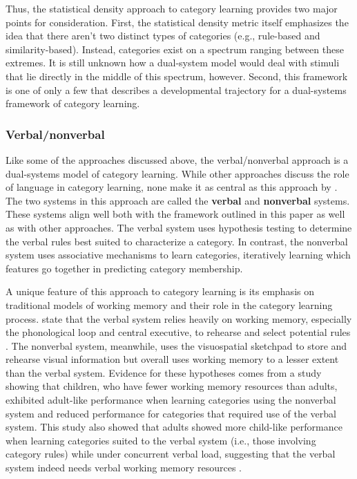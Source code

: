 \documentclass[../dissertation.tex]{subfiles}
\begin{document}
	Thus, the statistical density approach to category learning provides two major points for consideration. First, the statistical density metric itself emphasizes the idea that there aren't two distinct types of categories (e.g., rule-based and similarity-based). Instead, categories exist on a spectrum ranging between these extremes. It is still unknown how a dual-system model would deal with stimuli that lie directly in the middle of this spectrum, however. Second, this framework is one of only a few that describes a developmental trajectory for a dual-systems framework of category learning.
	
\subsubsection{Verbal/nonverbal}
	Like some of the approaches discussed above, the verbal/nonverbal approach is a dual-systems model of category learning. While other approaches discuss the role of language in category learning, none make it as central as this approach by \citet{Minda2010}. The two systems in this approach are called the \textbf{verbal} and \textbf{nonverbal} systems. These systems align well both with the framework outlined in this paper as well as with other approaches. The verbal system uses hypothesis testing to determine the verbal rules best suited to characterize a category. In contrast, the nonverbal system uses associative mechanisms to learn categories, iteratively learning which features go together in predicting category membership. \par
	A unique feature of this approach to category learning is its emphasis on traditional models of working memory and their role in the category learning process. \citet{Minda2010} state that the verbal system relies heavily on working memory, especially the phonological loop and central executive, to rehearse and select potential rules \citep{Baddeley1974}. The nonverbal system, meanwhile, uses the visuospatial sketchpad to store and rehearse visual information but overall uses working memory to a lesser extent than the verbal system. Evidence for these hypotheses comes from a study showing that children, who have fewer working memory resources than adults, exhibited adult-like performance when learning categories using the nonverbal system and reduced performance for categories that required use of the verbal system. This study also showed that adults showed more child-like performance when learning categories suited to the verbal system (i.e., those involving category rules)  while under concurrent verbal load, suggesting that the verbal system indeed needs verbal working memory resources \citep{Minda2008}. \par
\end{document}
